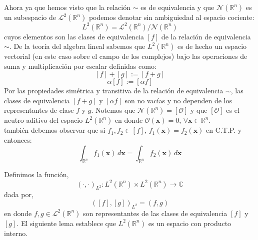 \documentclass[12pt]{book}
\numberwithin{equation}{chapter}
\def\n{\noindent}
\def\R{\mathbb{R}}
\def\C{\mathbb{C}}
\def\L{\mathcal{L}}
\def\rar{\rightarrow}
\def\N{\mathcal{N}}
\def\x{\mathbf{x}}
\begin{document}
\vspace{5 mm}
Ahora ya que hemos visto que la relaci\'on $\sim$ es de equivalencia y que $\N(\R^{n})$ es un subespacio de $\L^{2}(\R^{n})$ podemos denotar sin ambiguiedad al espacio cociente:
$$ L^{2}(\R^{n})= \L^{2}(\R^{n}) / \N(\R^{n}) $$
cuyos elementos son las clases de equivalencia $[f]$ de la relaci\'on de equivalencia $\sim$. De la teor\'ia del algebra lineal sabemos que $L^{2}(\R^{n})$ es de hecho un espacio vectorial (en este caso sobre el campo de los complejos) bajo las operaciones de suma y multiplicaci\'on por escalar definidas como:
$$ [f]+[g] := [f+g] $$
$$ \alpha [f] := [\alpha f] $$
Por las propiedades sim\'etrica y transitiva de la relaci\'on de equivalencia $\sim$, las clases de equivalencia $[f+g]$ y $[\alpha f]$ son no vac\'ias y no dependen de los representantes de clase $f$ y $g$. Notemos que $\N(\R^{n}) = [\mathcal{O}]$ y que $[\mathcal{O}]$ es el neutro aditivo del espacio $L^{2}(\R^{n})$ en donde $\mathcal{O}(\x)=0$, $\forall \x \in \R^{n}$.\\
tambi\'en debemos observar que si $f_{1},f_{2} \in [f]$, $f_{1}(\x)=f_{2}(\x)$ en C.T.P. y entonces:
$$ \int_{\R^{n}} f_{1}(\x) \, d\x = \int_{\R^{n}} f_{2}(\x) \, d\x$$

\n Definimos la funci\'on, 
$$(\cdot , \cdot)_{L^{2}} : L^{2}(\R^{n}) \times L^{2}(\R^{n}) \rar \C $$ 
dada por, 
$$ ([f],[g])_{L^{2}} = (f,g) $$
en donde $f,g \in \L^{2}(\R^{n})$ son representantes de las clases de equivalencia $[f]$ y $[g]$. El siguiente lema establece que $L^{2}(\R^{n})$ es un espacio con producto interno.

\vspace{5 mm}
\end{document}
